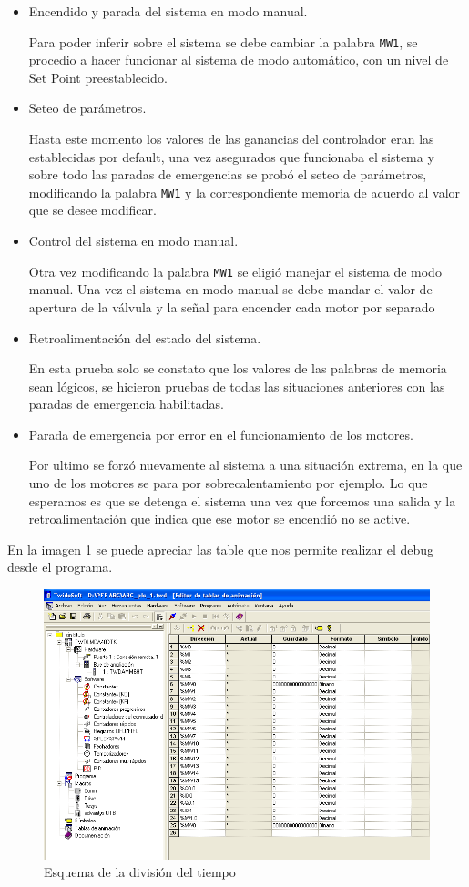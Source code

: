 \begin{itemize}
 \item Encendido y parada del sistema en modo manual.
 
 Para poder inferir sobre el sistema se debe cambiar la palabra \verb|MW1|, se procedio a
 hacer funcionar al sistema de modo automático, con un nivel de Set Point preestablecido.
 
 \item Seteo de parámetros.
 
 Hasta este momento los valores de las ganancias del controlador eran las establecidas por 
 default, una vez asegurados que funcionaba el sistema y sobre todo las paradas de emergencias
 se probó el seteo de parámetros, modificando la palabra \verb|MW1| y la correspondiente 
 memoria de acuerdo al valor que se desee modificar.
 
 \item Control del sistema en modo manual.
 
 Otra vez modificando la palabra \verb|MW1| se eligió manejar el sistema de modo manual.
 Una vez el sistema en modo manual se debe mandar el valor de apertura de la válvula y 
 la señal para encender cada motor por separado
 
 \item Retroalimentación del estado del sistema.
 
 En esta prueba solo se constato que los valores de las palabras de memoria sean lógicos,
 se hicieron pruebas de todas las situaciones anteriores con las paradas de emergencia 
 habilitadas.
 
 \item Parada de emergencia por error en el funcionamiento de los motores.
 
 Por ultimo se forzó nuevamente al sistema a una situación extrema, en la que uno
 de los motores se para por sobrecalentamiento por ejemplo. Lo que esperamos es que se
 detenga el sistema una vez que forcemos una salida y la retroalimentación que indica que
 ese motor se encendió no se active.
 
\end{itemize}

En la imagen \ref{img:twidosoftdebug} se puede apreciar las table que nos permite realizar
el debug desde el programa.

\begin{figure}[ht!]
	\centering
	\includegraphics[scale=0.5]{Cap4-ProgramacionPLC/images/twidosoftdebug.png}
	\caption{Esquema de la división del tiempo}
	\label{img:twidosoftdebug}
\end{figure}